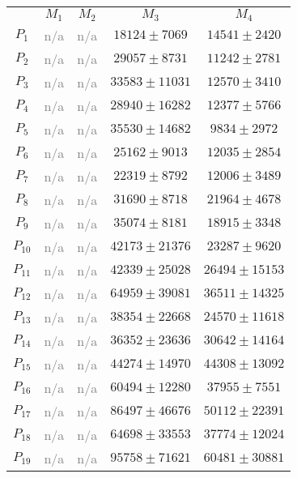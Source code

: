 \documentclass[12pt]{article}
\begin{document}
\begin{appendices}
\begin{table}[H]
\begin{tabular}{ccccc}
 & $M_{1}$  & $M_{2}$  & $M_{3}$  & $M_{4}$ \\ \cline{2-5}
$P_{1}$  & \textcolor{gray}{n/a}  & \textcolor{gray}{n/a}  & $18124\pm7069$  & $14541\pm2420$ \\
$P_{2}$  & \textcolor{gray}{n/a}  & \textcolor{gray}{n/a}  & $29057\pm8731$  & $11242\pm2781$ \\
$P_{3}$  & \textcolor{gray}{n/a}  & \textcolor{gray}{n/a}  & $33583\pm11031$  & $12570\pm3410$ \\
$P_{4}$  & \textcolor{gray}{n/a}  & \textcolor{gray}{n/a}  & $28940\pm16282$  & $12377\pm5766$ \\
$P_{5}$  & \textcolor{gray}{n/a}  & \textcolor{gray}{n/a}  & $35530\pm14682$  & $9834\pm2972$ \\
$P_{6}$  & \textcolor{gray}{n/a}  & \textcolor{gray}{n/a}  & $25162\pm9013$  & $12035\pm2854$ \\
$P_{7}$  & \textcolor{gray}{n/a}  & \textcolor{gray}{n/a}  & $22319\pm8792$  & $12006\pm3489$ \\
$P_{8}$  & \textcolor{gray}{n/a}  & \textcolor{gray}{n/a}  & $31690\pm8718$  & $21964\pm4678$ \\
$P_{9}$  & \textcolor{gray}{n/a}  & \textcolor{gray}{n/a}  & $35074\pm8181$  & $18915\pm3348$ \\
$P_{10}$  & \textcolor{gray}{n/a}  & \textcolor{gray}{n/a}  & $42173\pm21376$  & $23287\pm9620$ \\
$P_{11}$  & \textcolor{gray}{n/a}  & \textcolor{gray}{n/a}  & $42339\pm25028$  & $26494\pm15153$ \\
$P_{12}$  & \textcolor{gray}{n/a}  & \textcolor{gray}{n/a}  & $64959\pm39081$  & $36511\pm14325$ \\
$P_{13}$  & \textcolor{gray}{n/a}  & \textcolor{gray}{n/a}  & $38354\pm22668$  & $24570\pm11618$ \\
$P_{14}$  & \textcolor{gray}{n/a}  & \textcolor{gray}{n/a}  & $36352\pm23636$  & $30642\pm14164$ \\
$P_{15}$  & \textcolor{gray}{n/a}  & \textcolor{gray}{n/a}  & $44274\pm14970$  & $44308\pm13092$ \\
$P_{16}$  & \textcolor{gray}{n/a}  & \textcolor{gray}{n/a}  & $60494\pm12280$  & $37955\pm7551$ \\
$P_{17}$  & \textcolor{gray}{n/a}  & \textcolor{gray}{n/a}  & $86497\pm46676$  & $50112\pm22391$ \\
$P_{18}$  & \textcolor{gray}{n/a}  & \textcolor{gray}{n/a}  & $64698\pm33553$  & $37774\pm12024$ \\
$P_{19}$  & \textcolor{gray}{n/a}  & \textcolor{gray}{n/a}  & $95758\pm71621$  & $60481\pm30881$ \\

\end{tabular}
\end{table}
\end{appendices}
\end{document}
